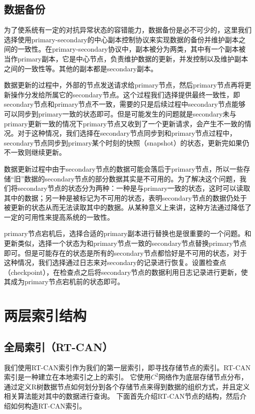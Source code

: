 \documentclass{ML}
\begin{document}
\subsection{数据备份}
为了使系统有一定的对抗异常状态的容错能力，数据备份是必不可少的，这里我们选择使用primary-secondary的中心副本控制协议来实现数据的备份并维护副本之间的一致性。在primary-secondary协议中，副本被分为两类，其中有一个副本被当作primary副本，它是中心节点，负责维护数据的更新，并发控制以及维护副本之间的一致性等。其他的副本都是secondary副本。

数据更新的过程中，外部的节点发送请求给primary节点，然后primary节点再将更新操作分发给所属它的secondary节点。这个过程我们选择提供最终一致性，即secondary节点和primary节点不一致，需要的只是后续过程中secondary节点能够可以同步到primary一致的状态即可。但是可能发生的问题就是secondary未与primary更新一致的情况下primary节点又收到了一个更新请求，会产生不一致的情况。对于这种情况，我们选择在secondary节点同步到和primary节点过程中，secondary节点同步到primary某个时刻的快照（snapshot）的状态，更新完如果仍不一致则继续更新。

数据更新过程中由于secondary节点的数据可能会落后于primary节点，所以一些存储“旧”数据的secondary节点的部分数据其实是不可用的。为了解决这个问题，我们将secondary节点的状态分为两种：一种是与primary一致的状态，这时可以读取其中的数据；另一种是被标记为不可用的状态，表明secondary节点的数据仍处于被更新的状态从而无法读取其中的数据。从某种意义上来讲，这种方法通过降低了一定的可用性来提高系统的一致性。

primary节点宕机后，选择合适的primary副本进行替换也是很重要的一个问题。和更新类似，选择一个状态为和primary节点一致的secondary节点替换primary节点即可。但是可能存在的状态是所有的secondary节点都恰好是不可用的状态，对于这种情况，我们选择通过日志来对secondary的记录进行恢复。设置检查点（checkpoint），在检查点之后将secondary节点的数据利用日志记录进行更新，使其成为primary节点宕机前的状态即可。

\section{两层索引结构}
\subsection{全局索引（RT-CAN）}
我们使用RT-CAN索引作为我们的第一层索引，即寻找存储节点的索引。RT-CAN索引是一种建立在本地索引之上的索引\cite{RT-CAN}。
它使用$C^2$网络作为底层存储节点分布，通过定义R树数据节点如何划分到各个存储节点来得到数据的组织方式，并且定义相关算法能对其中的数据进行查询。
下面首先介绍RT-CAN节点的结构，然后介绍如何构造RT-CAN索引。
\end{document}

